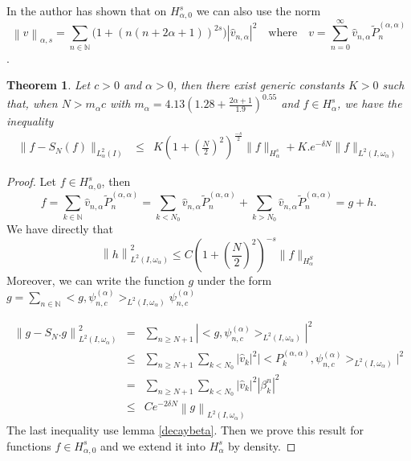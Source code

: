 \documentclass[]{article}
\newtheorem{theorem}{Theorem}
\newcommand{\N}{\mathbb N}
\newcommand{\ps}{\psi_{n,c}^{(\alpha)}}
\newcommand{\norm}[1]{{\left\|{#1}\right\|}}
\begin{document}
In \cite{Nicaise} the author has shown that on $H^s_{\alpha,0}$ we can also use the norm
$$ \norm{v}_{\alpha,s} = \sum_{n\in \N}\Big(1+(n(n+2\alpha+1))^{2s}\Big) |\hat{v}_{n,\alpha} |^2 \quad \mbox{where} \quad v = \sum_{n=0}^{\infty} \hat{v}_{n,\alpha}\widetilde{P}_n^{(\alpha,\alpha)} $$.



\begin{theorem}
		Let $c>0$ and $\alpha  >0 $, then there exist generic constants $K>0$ such that, when
		$N >  m_{\alpha}c$ with $m_{\alpha}=4.13\left(1.28+\frac{2\alpha+1}{1.9}\right)^{0.55}$    and $f \in H^s_{\alpha}$, we have the inequality
		\begin{eqnarray} \label{ineq}
		\|f-S_N(f)\|_{L^2_{\alpha}(I)} &\leq& K\left(1+ \left(\frac{N}{2}\right)^2\right)^{\frac{-s}{2}} \|f\|_{H^s_{\alpha}} +K.e^{-\delta N}\|f\|_{L^2(I,\omega_{\alpha})}
		\end{eqnarray}		
\end{theorem}

\begin{proof}
Let $ f \in H^s_{\alpha,0}$, then
$$ f = \sum_{k \in \N} \hat{v}_{n,\alpha}\widetilde{P}_n^{(\alpha,\alpha)} = \sum_{k<N_0} \hat{v}_{n,\alpha}\widetilde{P}_n^{(\alpha,\alpha)} + \sum_{k>N_0}\hat{v}_{n,\alpha}\widetilde{P}_n^{(\alpha,\alpha)} = g+h .$$
We have directly that
\begin{equation}
\norm{h}_{L^2(I,\omega_{\alpha})}^2  \leq C (1+(\frac{N}{2})^2)^{-s}\|f\|_{H^S_{\alpha}}
\end{equation}
Moreover, we can write the function $g$ under the form
$
g = \displaystyle \sum_{n \in \N} <g,\ps>_{L^2(I,\omega_{\alpha})} \ps
$

\begin{eqnarray}
\norm{g-S_N.g}_{L^2(I,\omega_{\alpha})}^2 &=& \sum_{n \geq N+1} |<g,\ps>_{L^2(I,\omega_{\alpha})}|^2 \nonumber \\
&\leq& \sum_{n\geq N+1} \sum_{k<N_0} |\hat{v}_k|^2 \Big|<P^{(\alpha,\alpha)}_k,\ps>_{L^2(I,\omega_{\alpha})}\Big|^2 \nonumber \\
&=& \sum_{n\geq N+1} \sum_{k<N_0} |\hat{v}_k|^2 |\beta_k^n|^2 \nonumber \\
& \leq & C e^{-2 \delta N} \norm{g}_{L^2(I,\omega_{\alpha})}
\end{eqnarray}
The last inequality use lemma \ref{decaybeta}.
Then we prove this result for functions $ f \in H^s_{\alpha,0} $ and we extend it into $ H^s_{\alpha} $ by density.
\end{proof}
\end{document}
